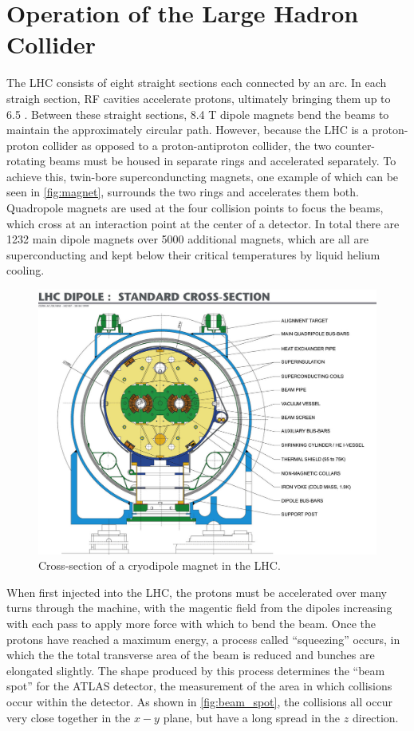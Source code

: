 \section{Operation of the Large Hadron Collider}

The \ac{LHC} consists of eight straight sections each connected by an arc. In each straigh section, \ac{RF} cavities accelerate protons, ultimately bringing them up to 6.5 \gev. Between these straight sections, 8.4 T dipole magnets bend the beams to maintain the approximately circular path. However, because the \ac{LHC} is a proton-proton collider as opposed to a proton-antiproton collider, the two counter-rotating beams must be housed in separate rings and accelerated separately. To achieve this, twin-bore superconduncting magnets, one example of which can be seen in \autoref{fig:magnet}, surrounds the two rings and accelerates them both. Quadropole magnets are used at the four collision points to focus the beams, which cross at an interaction point at the center of a detector. In total there are 1232  main dipole magnets over 5000 additional magnets, which are all are superconducting and kept below their critical temperatures by liquid helium cooling. 

\begin{centering}
\begin{figure}[!hbt]
\myfloatalign
\includegraphics[width=.90\linewidth]{figures/lhc/magnet.jpg}
\caption{Cross-section of a cryodipole magnet in the \ac{LHC}.}
\label{fig:magnet}
\end{figure}
\end{centering}

When first injected into the \ac{LHC}, the protons must be accelerated over many turns through the machine, with the magentic field from the dipoles increasing with each pass to apply more force with which to bend the beam. Once the protons have reached a maximum energy, a process called ``squeezing'' occurs, in which the the total transverse area of the beam is reduced and bunches are elongated slightly. The shape produced by this process determines the ``beam spot'' for the ATLAS detector, the measurement of the area in which collisions occur within the detector. As shown in \autoref{fig:beam_spot}, the collisions all occur very close together in the $x-y$ plane, but have a long spread in the $z$ direction.

